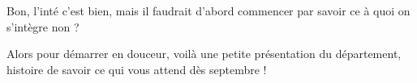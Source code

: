 Bon, l'inté c'est bien, mais il faudrait d'abord commencer par savoir ce à quoi on s'intègre non ? 

Alors pour démarrer en douceur, voilà une petite présentation du département, histoire de savoir ce qui vous attend dès septembre ! 
